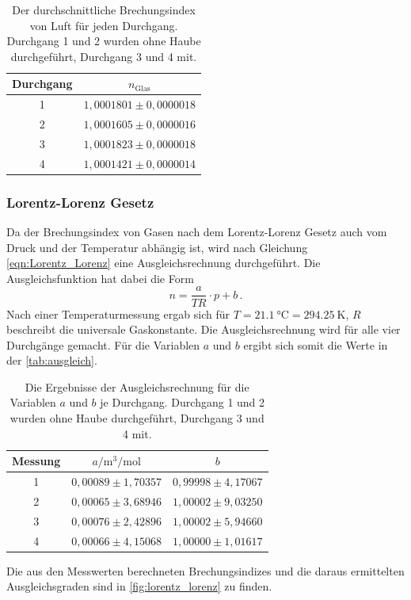 \begin{table}[H]
  \centering
  \caption{Der durchschnittliche Brechungsindex von Luft für jeden Durchgang. Durchgang 1 und 2 wurden ohne Haube durchgeführt, Durchgang 3 und 4 mit.}
  \label{tab:n_luft_mean}
  \begin{tabular}{c c}
    \toprule
    Durchgang & $n_\text{Glas}$ \\
    \midrule
    1    &  $1,0001801 \pm 0,0000018$ \\   
    2    &  $1,0001605 \pm 0,0000016$ \\   
    3    &  $1,0001823 \pm 0,0000018$ \\   
    4    &  $1,0001421 \pm 0,0000014$ \\   
    \bottomrule
  \end{tabular}
\end{table}

\subsubsection{Lorentz-Lorenz Gesetz}
Da der Brechungsindex von Gasen nach dem Lorentz-Lorenz Gesetz auch vom Druck und  der Temperatur abhängig ist, wird nach Gleichung \eqref{eqn:Lorentz_Lorenz} eine Ausgleichsrechnung durchgeführt.
Die Ausgleichsfunktion hat dabei die Form
\begin{equation*}
  n = \frac{a}{TR} \cdot p + b \, .
\end{equation*}
Nach einer Temperaturmessung ergab sich für $T = \SI{21.1}{\celsius} = \SI{294.25}{\kelvin}$, $R$ beschreibt die universale Gaskonstante.
Die Ausgleichsrechnung wird für alle vier Durchgänge gemacht.
Für die Variablen $a$ und $b$ ergibt sich somit die Werte in der \autoref{tab:ausgleich}.
\begin{table}[H]
  \centering
  \caption{Die Ergebnisse der Ausgleichsrechnung für die Variablen $a$ und $b$ je Durchgang. Durchgang 1 und 2 wurden ohne Haube durchgeführt, Durchgang 3 und 4 mit.}
  \label{tab:ausgleich} 
  \begin{tabular}{c c c}
    \toprule
    Messung & $a / \si{\cubic\metre\per\mole}$ & $b$ \\
    \midrule
    1    &  $0,00089 \pm 1,70357$ & $0,99998 \pm 4,17067$ \\   
    2    &  $0,00065 \pm 3,68946$ & $1,00002 \pm 9,03250$ \\   
    3    &  $0,00076 \pm 2,42896$ & $1,00002 \pm 5,94660$ \\   
    4    &  $0,00066 \pm 4,15068$ & $1,00000 \pm 1,01617$ \\
    \bottomrule
  \end{tabular}
\end{table}
\noindent
Die aus den Messwerten berechneten Brechungsindizes und die daraus ermittelten Ausgleichsgraden sind in \autoref{fig:lorentz_lorenz} zu finden.


